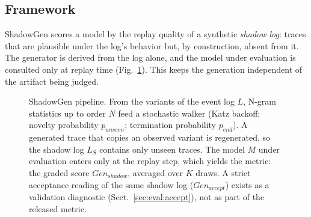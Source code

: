 \documentclass[runningheads]{llncs}
\newcommand{\genshadow}{\ensuremath{\mathit{Gen}_{\mathit{shadow}}}}
\newcommand{\genaccept}{\ensuremath{\mathit{Gen}_{\mathit{accept}}}}
\newcommand{\punseen}{\ensuremath{p_{\mathit{unseen}}}}
\newcommand{\pend}{\ensuremath{p_{\mathit{end}}}}
\newcommand{\shlog}{\ensuremath{L_S}}
\begin{document}
\subsection{Framework}
\label{sec:method:framework}
ShadowGen scores a model by the replay quality of a synthetic \emph{shadow log}: traces that are plausible under the log's behavior but, by construction, absent from it. The generator is derived from the log alone, and the model under evaluation is consulted only at replay time (Fig.~\ref{fig:pipeline}). This keeps the generation independent of the artifact being judged.

\begin{figure}[t]
\centering
{}
\caption{ShadowGen pipeline. From the variants of the event log $L$, N-gram statistics up to order $N$ feed a stochastic walker (Katz backoff; novelty probability $\punseen$; termination probability $\pend$). A generated trace that copies an observed variant is regenerated, so the shadow log $\shlog$ contains only unseen traces. The model $M$ under evaluation enters only at the replay step, which yields the metric: the graded score \genshadow{}, averaged over $K$ draws. A strict acceptance reading of the same shadow log (\genaccept) exists as a validation diagnostic (Sect.~\ref{sec:eval:accept}), not as part of the released metric.}
\label{fig:pipeline}
\end{figure}
\end{document}
